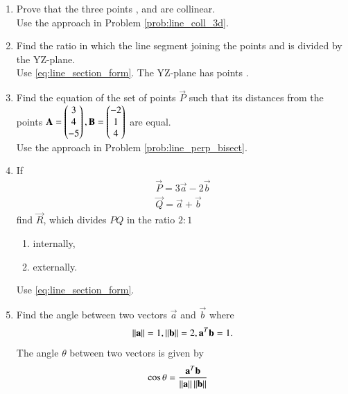 \begin{enumerate}[label=\arabic*.,ref=\thesubsection.\theenumi]
\item Prove that the three points ,  and  are collinear.
%
\\
\solution  Use the approach in Problem \ref{prob:line_coll_3d}.
%
\item Find the ratio in which the line segment joining the points  and  is divided by the YZ-plane.
%
\\
\solution Use \eqref{eq:line_section_form}.  The YZ-plane has points .
%
\item Find the equation of the set of points $\vec{P}$ such that its distances from the points
$
\mathbf{A}=\begin{pmatrix}3\\4\\-5\end{pmatrix}, 
\mathbf{B}=\begin{pmatrix}-2\\1\\4\end{pmatrix}
$
are equal. 
%
\\
\solution Use the approach in Problem \ref{prob:line_perp_bisect}.
\item If 
\begin{align}
\vec{P} = 3\vec{a}-2\vec{b}
\\
\vec{Q} = \vec{a}+\vec{b}
\end{align}
%
find $\vec{R}$, which divides $PQ$ in the ratio $2:1$
\begin{enumerate}
\item internally,
\item externally.
\end{enumerate}
%
\solution Use \eqref{eq:line_section_form}.  
%
\item Find the angle between two vectors $\vec{a}$ and $\vec{b}$ where 
%
\begin{align}
\left\lVert\mathbf{a}\right\rVert = 1,
\left\lVert\mathbf{b}\right\rVert = 2,
\mathbf{a}^T\mathbf{b} = 1.
\end{align}
%
\solution The angle $\theta$ between two vectors is given by 
%
\begin{align}
\label{eq:line_inner_prod}
\cos \theta &= \frac{\vec{a}^T\vec{b}}{\norm{\vec{a}}\norm{\vec{b}}}

\end{align}
\end{enumerate}
